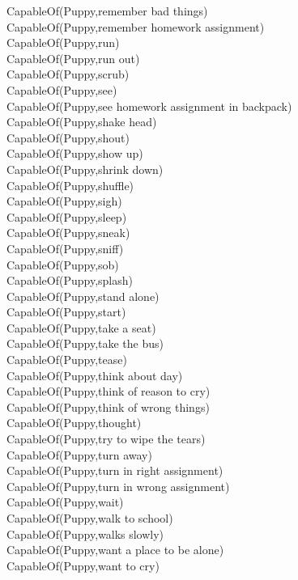 \begin{multicols}{2}
\begin{footnotesize}
CapableOf(Puppy,remember bad things) \\
CapableOf(Puppy,remember homework assignment) \\
CapableOf(Puppy,run) \\
CapableOf(Puppy,run out) \\
CapableOf(Puppy,scrub) \\
CapableOf(Puppy,see) \\
CapableOf(Puppy,see homework assignment in backpack) \\
CapableOf(Puppy,shake head) \\
CapableOf(Puppy,shout) \\
CapableOf(Puppy,show up) \\
CapableOf(Puppy,shrink down) \\
CapableOf(Puppy,shuffle) \\
CapableOf(Puppy,sigh) \\
CapableOf(Puppy,sleep) \\
CapableOf(Puppy,sneak) \\
CapableOf(Puppy,sniff) \\
CapableOf(Puppy,sob) \\
CapableOf(Puppy,splash) \\
CapableOf(Puppy,stand alone) \\
CapableOf(Puppy,start) \\
CapableOf(Puppy,take a seat) \\
CapableOf(Puppy,take the bus) \\
CapableOf(Puppy,tease) \\
CapableOf(Puppy,think about day) \\
CapableOf(Puppy,think of reason to cry) \\
CapableOf(Puppy,think of wrong things) \\
CapableOf(Puppy,thought) \\
CapableOf(Puppy,try to wipe the tears) \\
CapableOf(Puppy,turn away) \\
CapableOf(Puppy,turn in right assignment) \\
CapableOf(Puppy,turn in wrong assignment) \\
CapableOf(Puppy,wait) \\
CapableOf(Puppy,walk to school) \\
CapableOf(Puppy,walks slowly) \\
CapableOf(Puppy,want a place to be alone) \\
CapableOf(Puppy,want to cry) \\

\end{footnotesize}
\end{multicols}
